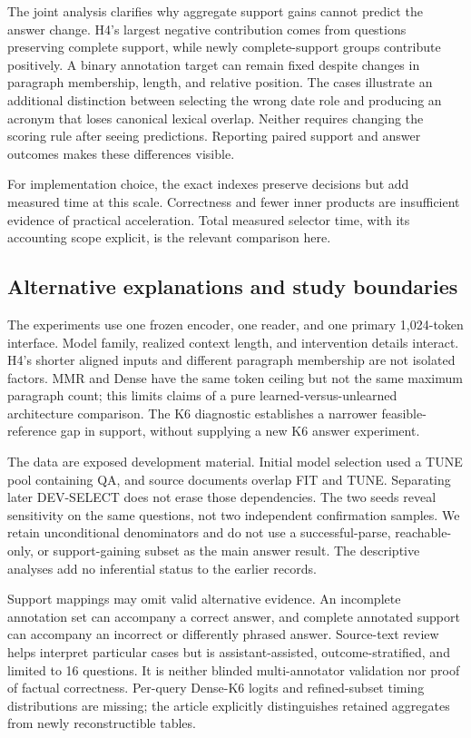 \documentclass[preprint,12pt]{elsarticle}
\begin{document}
The joint analysis clarifies why aggregate support gains cannot predict the answer change. H4's largest negative contribution comes from questions preserving complete support, while newly complete-support groups contribute positively. A binary annotation target can remain fixed despite changes in paragraph membership, length, and relative position. The cases illustrate an additional distinction between selecting the wrong date role and producing an acronym that loses canonical lexical overlap. Neither requires changing the scoring rule after seeing predictions. Reporting paired support and answer outcomes makes these differences visible.

For implementation choice, the exact indexes preserve decisions but add measured time at this scale. Correctness and fewer inner products are insufficient evidence of practical acceleration. Total measured selector time, with its accounting scope explicit, is the relevant comparison here.

\subsection{Alternative explanations and study boundaries}
The experiments use one frozen encoder, one reader, and one primary 1,024-token interface. Model family, realized context length, and intervention details interact. H4's shorter aligned inputs and different paragraph membership are not isolated factors. MMR and Dense have the same token ceiling but not the same maximum paragraph count; this limits claims of a pure learned-versus-unlearned architecture comparison. The K6 diagnostic establishes a narrower feasible-reference gap in support, without supplying a new K6 answer experiment.

The data are exposed development material. Initial model selection used a TUNE pool containing QA, and source documents overlap FIT and TUNE. Separating later DEV-SELECT does not erase those dependencies. The two seeds reveal sensitivity on the same questions, not two independent confirmation samples. We retain unconditional denominators and do not use a successful-parse, reachable-only, or support-gaining subset as the main answer result. The descriptive analyses add no inferential status to the earlier records.

Support mappings may omit valid alternative evidence. An incomplete annotation set can accompany a correct answer, and complete annotated support can accompany an incorrect or differently phrased answer. Source-text review helps interpret particular cases but is assistant-assisted, outcome-stratified, and limited to 16 questions. It is neither blinded multi-annotator validation nor proof of factual correctness. Per-query Dense-K6 logits and refined-subset timing distributions are missing; the article explicitly distinguishes retained aggregates from newly reconstructible tables.
\end{document}
